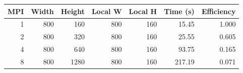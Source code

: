 \begin{tabular}{@{}rrrrrrr@{}}
\toprule
MPI & Width & Height & Local W & Local H & Time (s) & Efficiency \\
\midrule
1 & 800 & 160 & 800 & 160 & 15.45 & 1.000 \\
2 & 800 & 320 & 800 & 160 & 25.55 & 0.605 \\
4 & 800 & 640 & 800 & 160 & 93.75 & 0.165 \\
8 & 800 & 1280 & 800 & 160 & 217.19 & 0.071 \\
\bottomrule
\end{tabular}
